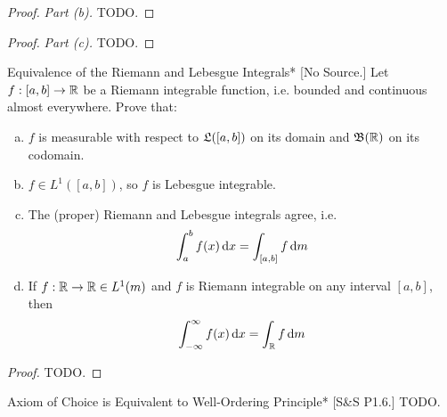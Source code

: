 \begin{proof}
    \emph{Part (b).} TODO. 
\end{proof}


\begin{proof}
    \emph{Part (c).} TODO. 
\end{proof}


\begin{problem}{Equivalence of the Riemann and Lebesgue Integrals}*
    [No Source.] Let \(f : [a, b] \to \mathbb{R}\) be a Riemann integrable function, i.e. bounded and continuous almost everywhere. Prove that: 
    \begin{enumerate}[(a)]
        \itemsep0em
        \item \(f\) is measurable with respect to \(\mathfrak{L}([a, b])\) on its domain and \(\mathfrak{B}(\mathbb{R})\) on its codomain. 
        \item \(f \in L^1([a, b])\), so \(f\) is Lebesgue integrable. 
        \item The (proper) Riemann and Lebesgue integrals agree, i.e. 
        \[
            \int_a^b f(x) \, \mathrm{d}x = \int_{[a, b]} f \, \mathrm{d}m
        \]
        \item If \(f : \mathbb{R} \to \mathbb{R} \in L^1(m)\) and \(f\) is Riemann integrable on any interval \([a, b]\), then 
        \[
            \int_{-\infty}^{\infty} f(x) \, \mathrm{d}x = \int_{\mathbb{R}} f \, \mathrm{d}m
        \]
    \end{enumerate}
\end{problem}

\begin{proof}
    TODO. 
\end{proof}


\begin{problem}{Axiom of Choice is Equivalent to Well-Ordering Principle}*
    [S\&S P1.6.] TODO. 
\end{problem}


